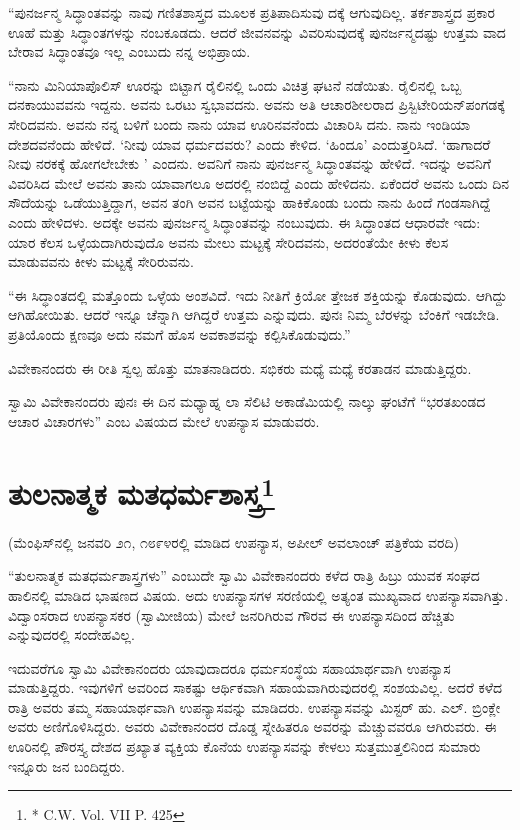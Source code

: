 “ಪುನರ್ಜನ್ಮ ಸಿದ್ಧಾಂತವನ್ನು ನಾವು ಗಣಿತಶಾಸ್ತ್ರದ ಮೂಲಕ ಪ್ರತಿಪಾದಿಸುವು ದಕ್ಕೆ ಆಗುವುದಿಲ್ಲ. ತರ್ಕಶಾಸ್ತ್ರದ ಪ್ರಕಾರ ಊಹೆ ಮತ್ತು ಸಿದ್ಧಾಂತಗಳನ್ನು ನಂಬಕೂಡದು. ಆದರೆ ಜೀವನವನ್ನು ವಿವರಿಸುವುದಕ್ಕೆ ಪುನರ್ಜನ್ಮದಷ್ಟು ಉತ್ತಮ ವಾದ ಬೇರಾವ ಸಿದ್ಧಾಂತವೂ ಇಲ್ಲ ಎಂಬುದು ನನ್ನ ಅಭಿಪ್ರಾಯ.

“ನಾನು ಮಿನಿಯಾಪೊಲಿಸ್​ ಊರನ್ನು ಬಿಟ್ಟಾಗ ರೈಲಿನಲ್ಲಿ ಒಂದು ವಿಚಿತ್ರ ಘಟನೆ ನಡೆಯಿತು. ರೈಲಿನಲ್ಲಿ ಒಬ್ಬ ದನಕಾಯುವವನು ಇದ್ದನು. ಅವನು ಒರಟು ಸ್ವಭಾವದನು. ಅವನು ಅತಿ ಆಚಾರಶೀಲರಾದ ಪ್ರಿಸ್ಬಿಟೇರಿಯನ್​ ಪಂಗಡಕ್ಕೆ ಸೇರಿದವನು. ಅವನು ನನ್ನ ಬಳಿಗೆ ಬಂದು ನಾನು ಯಾವ ಊರಿನವನೆಂದು ವಿಚಾರಿಸಿ ದನು. ನಾನು ಇಂಡಿಯಾ ದೇಶದವನೆಂದು ಹೇಳಿದೆ. ‘ನೀವು ಯಾವ ಧರ್ಮದವರು? ಎಂದು ಕೇಳಿದ. ‘ಹಿಂದೂ’ ಎಂದುತ್ತರಿಸಿದೆ. ‘ಹಾಗಾದರೆ ನೀವು ನರಕಕ್ಕೆ ಹೋಗಲೇಬೇಕು ’ ಎಂದನು. ಅವನಿಗೆ ನಾನು ಪುನರ್ಜನ್ಮ ಸಿದ್ಧಾಂತವನ್ನು ಹೇಳಿದೆ. ಇದನ್ನು ಅವನಿಗೆ ವಿವರಿಸಿದ ಮೇಲೆ ಅವನು ತಾನು ಯಾವಾಗಲೂ ಅದರಲ್ಲಿ ನಂಬಿದ್ದೆ ಎಂದು ಹೇಳಿದನು. ಏಕೆಂದರೆ ಅವನು ಒಂದು ದಿನ ಸೌದೆಯನ್ನು ಒಡೆಯುತ್ತಿದ್ದಾಗ, ಅವನ ತಂಗಿ ಅವನ ಬಟ್ಟೆಯನ್ನು ಹಾಕಿಕೊಂಡು ಬಂದು ನಾನು ಹಿಂದೆ ಗಂಡಸಾಗಿದ್ದೆ ಎಂದು ಹೇಳಿದಳು. ಅದಕ್ಕೇ ಅವನು ಪುನರ್ಜನ್ಮ ಸಿದ್ಧಾಂತವನ್ನು ನಂಬುವುದು. ಈ ಸಿದ್ಧಾಂತದ ಆಧಾರವೇ ಇದು: ಯಾರ ಕೆಲಸ ಒಳ್ಳೆಯದಾಗಿರುವುದೊ ಅವನು ಮೇಲು ಮಟ್ಟಕ್ಕೆ ಸೇರಿದವನು, ಅದರಂತೆಯೇ ಕೀಳು ಕೆಲಸ ಮಾಡುವವನು ಕೀಳು ಮಟ್ಟಕ್ಕೆ ಸೇರಿರುವನು.

“ಈ ಸಿದ್ಧಾಂತದಲ್ಲಿ ಮತ್ತೊಂದು ಒಳ್ಳೆಯ ಅಂಶವಿದೆ. ಇದು ನೀತಿಗೆ ಕ್ರಿಯೋ ತ್ತೇಜಕ ಶಕ್ತಿಯನ್ನು ಕೊಡುವುದು. ಆಗಿದ್ದು ಆಗಿಹೋಯಿತು. ಆದರೆ ಇನ್ನೂ ಚೆನ್ನಾಗಿ ಆಗಿದ್ದರೆ ಉತ್ತಮ ಎನ್ನುವುದು. ಪುನಃ ನಿಮ್ಮ ಬೆರಳನ್ನು ಬೆಂಕಿಗೆ ಇಡಬೇಡಿ. ಪ್ರತಿಯೊಂದು ಕ್ಷಣವೂ ಅದು ನಮಗೆ ಹೊಸ ಅವಕಾಶವನ್ನು ಕಲ್ಪಿಸಿಕೊಡುವುದು.”

ವಿವೇಕಾನಂದರು ಈ ರೀತಿ ಸ್ವಲ್ಪ ಹೊತ್ತು ಮಾತನಾಡಿದರು. ಸಭಿಕರು ಮಧ್ಯೆ ಮಧ್ಯೆ ಕರತಾಡನ ಮಾಡುತ್ತಿದ್ದರು.

ಸ್ವಾಮಿ ವಿವೇಕಾನಂದರು ಪುನಃ ಈ ದಿನ ಮಧ್ಯಾಹ್ನ ಲಾ ಸೆಲಿಟಿ ಅಕಾಡೆಮಿಯಲ್ಲಿ ನಾಲ್ಕು ಘಂಟೆಗೆ “ಭರತಖಂಡದ ಆಚಾರ ವಿಚಾರಗಳು” ಎಂಬ ವಿಷಯದ ಮೇಲೆ ಉಪನ್ಯಾಸ ಮಾಡುವರು.


\section[ತುಲನಾತ್ಮಕ ಮತಧರ್ಮಶಾಸ್ತ್ರ]{ತುಲನಾತ್ಮಕ ಮತಧರ್ಮಶಾಸ್ತ್ರ\protect\footnote{* C.W. Vol. VII P. 425}}

\begin{center}
(ಮೆಂಫಿಸ್​ನಲ್ಲಿ ಜನವರಿ ೨೧, ೧೮೯೪ರಲ್ಲಿ ಮಾಡಿದ ಉಪನ್ಯಾಸ, ಅಪೀಲ್​ ಅವಲಾಂಚ್​ ಪತ್ರಿಕೆಯ ವರದಿ)
\end{center}

“ತುಲನಾತ್ಮಕ ಮತಧರ್ಮಶಾಸ್ತ್ರಗಳು” ಎಂಬುದೇ ಸ್ವಾಮಿ ವಿವೇಕಾನಂದರು ಕಳೆದ ರಾತ್ರಿ ಹಿಬ್ರು ಯುವಕ ಸಂಘದ ಹಾಲಿನಲ್ಲಿ ಮಾಡಿದ ಭಾಷಣದ ವಿಷಯ. ಅದು ಉಪನ್ಯಾಸಗಳ ಸರಣಿಯಲ್ಲಿ ಅತ್ಯಂತ ಮುಖ್ಯವಾದ ಉಪನ್ಯಾಸವಾಗಿತ್ತು. ವಿದ್ವಾಂಸರಾದ ಉಪನ್ಯಾಸಕರ (ಸ್ವಾಮೀಜಿಯ) ಮೇಲೆ ಜನರಿಗಿರುವ ಗೌರವ ಈ ಉಪನ್ಯಾಸದಿಂದ ಹೆಚ್ಚಿತು ಎನ್ನುವುದರಲ್ಲಿ ಸಂದೇಹವಿಲ್ಲ.

ಇದುವರೆಗೂ ಸ್ವಾಮಿ ವಿವೇಕಾನಂದರು ಯಾವುದಾದರೂ ಧರ್ಮಸಂಸ್ಥೆಯ ಸಹಾಯಾರ್ಥವಾಗಿ ಉಪನ್ಯಾಸ ಮಾಡುತ್ತಿದ್ದರು. ಇವುಗಳಿಗೆ ಅವರಿಂದ ಸಾಕಷ್ಟು ಆರ್ಥಿಕವಾಗಿ ಸಹಾಯವಾಗಿರುವುದರಲ್ಲಿ ಸಂಶಯವಿಲ್ಲ. ಅದರೆ ಕಳೆದ ರಾತ್ರಿ ಅವರು ತಮ್ಮ ಸಹಾಯಾರ್ಥವಾಗಿ ಉಪನ್ಯಾಸವನ್ನು ಮಾಡಿದರು. ಉಪನ್ಯಾಸವನ್ನು ಮಿಸ್ಟರ್​ ಹು. ಎಲ್​. ಬ್ರಿಂಕ್ಲೇ ಅವರು ಅಣಿಗೊಳಿಸಿದ್ದರು. ಅವರು ವಿವೇಕಾನಂದರ ದೊಡ್ಡ ಸ್ನೇಹಿತರೂ ಅವರನ್ನು ಮೆಚ್ಚುವವರೂ ಆಗಿರುವರು. ಈ ಊರಿನಲ್ಲಿ ಪೌರಸ್ತ್ಯ ದೇಶದ ಪ್ರಖ್ಯಾತ ವ್ಯಕ್ತಿಯ ಕೊನೆಯ ಉಪನ್ಯಾಸವನ್ನು ಕೇಳಲು ಸುತ್ತಮುತ್ತಲಿನಿಂದ ಸುಮಾರು ಇನ್ನೂರು ಜನ ಬಂದಿದ್ದರು.

